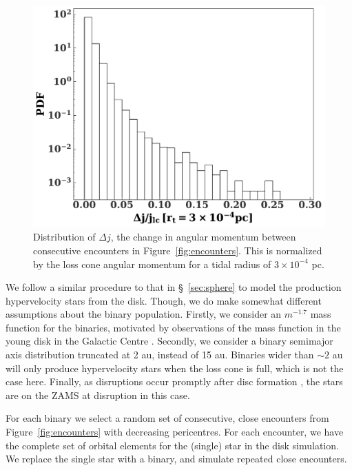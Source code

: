 \documentclass[fleqn,usenatbib]{mnras}
\begin{document}
    
    \begin{figure}
    \includegraphics[width=\columnwidth]{figures/delta_j_dist.pdf}
    \caption{Distribution of $\Delta j$, the change in angular momentum between consecutive encounters in Figure~\ref{fig:encounters}. This is normalized by the loss cone angular momentum for a tidal radius of $3\times 10^{-4}$ pc. }
    \label{fig:deltaJ}
    \end{figure}
 
We follow a similar procedure to that in \S~\ref{sec:sphere} to model the production hypervelocity stars from the disk. Though, we do make somewhat different assumptions about the binary population. Firstly, we consider an $m^{-1.7}$ mass function for the binaries, motivated by observations of the mass function in the young disk in the Galactic Centre \citep{lu+2013}. Secondly, we consider a binary semimajor axis distribution truncated at 2 au, instead of 15 au. Binaries wider than $\sim 2$ au will only produce hypervelocity stars when the loss cone is full, which is not the case here. Finally, as disruptions occur promptly after disc formation \citep{madigan+2009,generozov&madigan2020}, the stars are on the ZAMS at disruption in this case.


 
For each binary we select a random set of consecutive, close encounters from Figure~\ref{fig:encounters} with decreasing pericentres. For each encounter,
we have the complete set of orbital elements for the (single) star in the disk simulation.
We replace the single star with a binary, and simulate repeated close encounters. 
\end{document}
